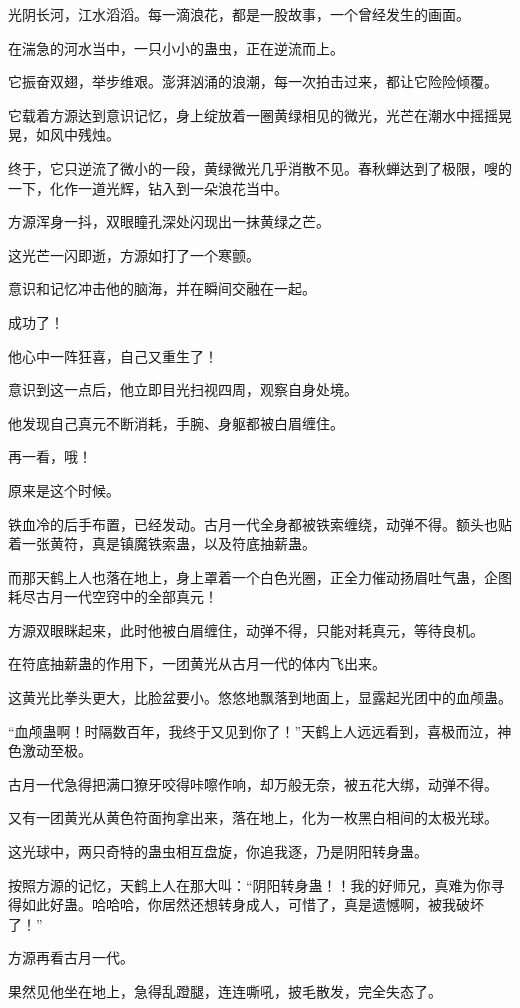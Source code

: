 \begin{this_body}
光阴长河，江水滔滔。每一滴浪花，都是一股故事，一个曾经发生的画面。

在湍急的河水当中，一只小小的蛊虫，正在逆流而上。

它振奋双翅，举步维艰。澎湃汹涌的浪潮，每一次拍击过来，都让它险险倾覆。

它载着方源达到意识记忆，身上绽放着一圈黄绿相见的微光，光芒在潮水中摇摇晃晃，如风中残烛。

终于，它只逆流了微小的一段，黄绿微光几乎消散不见。春秋蝉达到了极限，嗖的一下，化作一道光辉，钻入到一朵浪花当中。

方源浑身一抖，双眼瞳孔深处闪现出一抹黄绿之芒。

这光芒一闪即逝，方源如打了一个寒颤。

意识和记忆冲击他的脑海，并在瞬间交融在一起。

成功了！

他心中一阵狂喜，自己又重生了！

意识到这一点后，他立即目光扫视四周，观察自身处境。

他发现自己真元不断消耗，手腕、身躯都被白眉缠住。

再一看，哦！

原来是这个时候。

铁血冷的后手布置，已经发动。古月一代全身都被铁索缠绕，动弹不得。额头也贴着一张黄符，真是镇魔铁索蛊，以及符底抽薪蛊。

而那天鹤上人也落在地上，身上罩着一个白色光圈，正全力催动扬眉吐气蛊，企图耗尽古月一代空窍中的全部真元！

方源双眼眯起来，此时他被白眉缠住，动弹不得，只能对耗真元，等待良机。

在符底抽薪蛊的作用下，一团黄光从古月一代的体内飞出来。

这黄光比拳头更大，比脸盆要小。悠悠地飘落到地面上，显露起光团中的血颅蛊。

“血颅蛊啊！时隔数百年，我终于又见到你了！”天鹤上人远远看到，喜极而泣，神色激动至极。

古月一代急得把满口獠牙咬得咔嚓作响，却万般无奈，被五花大绑，动弹不得。

又有一团黄光从黄色符面拘拿出来，落在地上，化为一枚黑白相间的太极光球。

这光球中，两只奇特的蛊虫相互盘旋，你追我逐，乃是阴阳转身蛊。

按照方源的记忆，天鹤上人在那大叫：“阴阳转身蛊！！我的好师兄，真难为你寻得如此好蛊。哈哈哈，你居然还想转身成人，可惜了，真是遗憾啊，被我破坏了！”

方源再看古月一代。

果然见他坐在地上，急得乱蹬腿，连连嘶吼，披毛散发，完全失态了。


\end{this_body}
